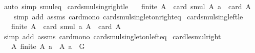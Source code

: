\begin{isabellebody}
\isamarkupfalse%
\ {\isacharparenleft}{\kern0pt}auto\ simp{\isacharcolon}{\kern0pt}\ smul{\isacharunderscore}{\kern0pt}eq{\isacharparenright}{\kern0pt}%
\endisatagproof
{\isafoldproof}%
%
\isadelimproof
\isanewline
%
\endisadelimproof
\isanewline
{}\isamarkupfalse%
\ card{\isacharunderscore}{\kern0pt}smul{\isacharunderscore}{\kern0pt}sing{\isacharunderscore}{\kern0pt}right{\isacharunderscore}{\kern0pt}le{\isacharcolon}{\kern0pt}\isanewline
\ \ \ {\isachardoublequoteopen}finite\ A{\isachardoublequoteclose}\ \ {\isachardoublequoteopen}card\ {\isacharparenleft}{\kern0pt}smul\ A\ {\isacharbraceleft}{\kern0pt}a{\isacharbraceright}{\kern0pt}{\isacharparenright}{\kern0pt}\ {\isasymle}\ card\ A{\isachardoublequoteclose}\isanewline
%
\isadelimproof
\ \ %
\endisadelimproof
%
\isatagproof
{}\isamarkupfalse%
\ {\isacharparenleft}{\kern0pt}simp\ add{\isacharcolon}{\kern0pt}\ assms\ card{\isacharunderscore}{\kern0pt}mono\ card{\isacharunderscore}{\kern0pt}smul{\isacharunderscore}{\kern0pt}singleton{\isacharunderscore}{\kern0pt}right{\isacharunderscore}{\kern0pt}eq{\isacharparenright}{\kern0pt}%
\endisatagproof
{\isafoldproof}%
%
\isadelimproof
\isanewline
%
\endisadelimproof
\isanewline
{}\isamarkupfalse%
\ card{\isacharunderscore}{\kern0pt}smul{\isacharunderscore}{\kern0pt}sing{\isacharunderscore}{\kern0pt}left{\isacharunderscore}{\kern0pt}le{\isacharcolon}{\kern0pt}\isanewline
\ \ \ {\isachardoublequoteopen}finite\ A{\isachardoublequoteclose}\ \ {\isachardoublequoteopen}card\ {\isacharparenleft}{\kern0pt}smul\ {\isacharbraceleft}{\kern0pt}a{\isacharbraceright}{\kern0pt}\ A{\isacharparenright}{\kern0pt}\ {\isasymle}\ card\ A{\isachardoublequoteclose}\isanewline
%
\isadelimproof
\ \ %
\endisadelimproof
%
\isatagproof
{}\isamarkupfalse%
\ {\isacharparenleft}{\kern0pt}simp\ add{\isacharcolon}{\kern0pt}\ assms\ card{\isacharunderscore}{\kern0pt}mono\ card{\isacharunderscore}{\kern0pt}smul{\isacharunderscore}{\kern0pt}singleton{\isacharunderscore}{\kern0pt}left{\isacharunderscore}{\kern0pt}eq{\isacharparenright}{\kern0pt}%
\endisatagproof
{\isafoldproof}%
%
\isadelimproof
\isanewline
%
\endisadelimproof
\isanewline
{}\isamarkupfalse%
\ card{\isacharunderscore}{\kern0pt}le{\isacharunderscore}{\kern0pt}smul{\isacharunderscore}{\kern0pt}right{\isacharcolon}{\kern0pt}\isanewline
\ \ \ A{\isacharcolon}{\kern0pt}\ {\isachardoublequoteopen}finite\ A{\isachardoublequoteclose}\ {\isachardoublequoteopen}a\ {\isasymin}\ A{\isachardoublequoteclose}\ {\isachardoublequoteopen}a\ {\isasymin}\ G{\isachardoublequoteclose}\isanewline

\end{isabellebody}
